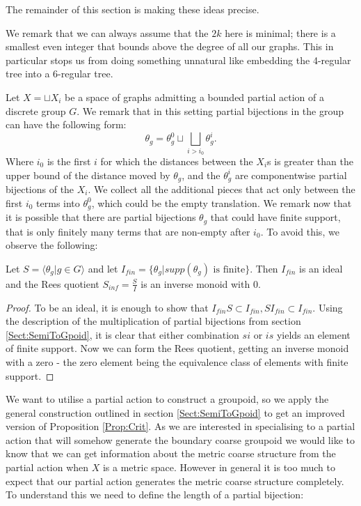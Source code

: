 The remainder of this section is making these ideas precise.

We remark that we can always assume that the $2k$ here is minimal; there is a smallest even integer that bounds above the degree of all our graphs. This in particular stops us from doing something unnatural like embedding the 4-regular tree into a 6-regular tree.

Let $X= \sqcup X_{i}$ be a space of graphs admitting a bounded partial action of a discrete group $G$. We remark that in this setting partial bijections in the group can have the following form: 
\begin{equation*}
\theta_{g}=\theta_{g}^{0} \sqcup \bigsqcup_{i>i_{0}}\theta_{g}^{i}.
\end{equation*} 
Where $i_{0}$ is the first $i$ for which the distances between the $X_{i}$s is greater than the upper bound of the distance moved by $\theta_{g}$, and the $\theta_{g}^{i}$ are componentwise partial bijections of the $X_{i}$. We collect all the additional pieces that act only between the first $i_{0}$ terms into $\theta_{g}^{0}$, which could be the empty translation. We remark now that it is possible that there are partial bijections $\theta_{g}$ that could have finite support, that is only finitely many terms that are non-empty after $i_{0}$. To avoid this, we observe the following:

\begin{proposition}
Let $S = \langle \theta_{g} | g \in G \rangle$ and let $I_{fin}= \lbrace \theta_{g} | supp(\theta_{g}) \mbox{ is finite} \rbrace$. Then $I_{fin}$ is an ideal and the Rees quotient $S_{inf}=\frac{S}{I}$ is an inverse monoid with $0$.
\end{proposition}
\begin{proof}
To be an ideal, it is enough to show that $I_{fin}S \subset I_{fin}, SI_{fin}\subset I_{fin}$. Using the description of the multiplication of partial bijections from section \ref{Sect:SemiToGpoid}, it is clear that either combination $si$ or $is$ yields an element of finite support. Now we can form the Rees quotient, getting an inverse monoid with a zero - the zero element being the equivalence class of elements with finite support.
\end{proof}

We want to utilise a partial action to construct a groupoid, so we apply the general construction outlined in section \ref{Sect:SemiToGpoid} to get an improved version of Proposition \ref{Prop:Crit}.
As we are interested in specialising to a partial action that will somehow generate the boundary coarse groupoid we would like to know that we can get information about the metric coarse structure from the partial action when $X$ is a metric space. However in general it is too much to expect that our partial action generates the metric coarse structure completely. To understand this we need to define the length of a partial bijection:

